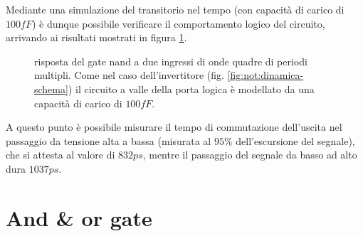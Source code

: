 	Mediante una simulazione del transitorio nel tempo (con capacità di carico di $100fF$) è dunque possibile verificare il comportamento logico del circuito, arrivando ai risultati mostrati in figura \ref{fig:nand:dinamica}.	

	\begin{figure}[bht]
		\centering
		
		\caption{risposta del gate nand a due ingressi di onde quadre di periodi multipli. Come nel caso dell'invertitore (fig. \ref{fig:not:dinamica-schema}) il circuito a valle della porta logica è modellato da una capacità di carico di $100fF$.}
		\label{fig:nand:dinamica}
	\end{figure}
	
	A questo punto è possibile misurare il tempo di commutazione dell'uscita nel passaggio da tensione alta a bassa (misurata al $95\%$ dell'escursione del segnale), che si attesta al valore di $832ps$, mentre il passaggio del segnale da basso ad alto dura $1037ps$.
	
\section{And \& or gate}
